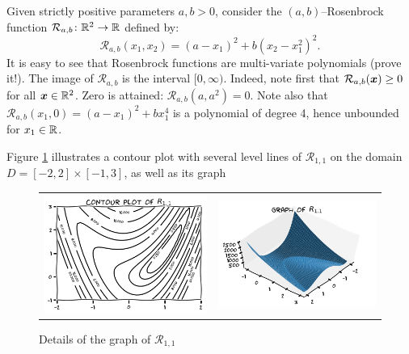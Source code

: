 \begin{example}\label{example:Rosenbrock2}
Given strictly positive parameters $a,b > 0$, consider the $(a,b)$--Rosenbrock function $\mathcal{R}_{a,b}\colon \mathbb{R}^2 \to \mathbb{R}$ defined by:
\begin{equation*} 
\mathcal{R}_{a,b}(x_1, x_2) = (a-x_1)^2 + b(x_2-x_1^2)^2.
\end{equation*}
It is easy to see that Rosenbrock functions are multi-variate polynomials (prove it!).  The image of $\mathcal{R}_{a,b}$ is the interval $[0,\infty)$.  Indeed, note first that $\mathcal{R}_{a,b}(\boldsymbol{x}) \geq 0$ for all $\boldsymbol{x} \in \mathbb{R}^2$.  Zero is attained: $\mathcal{R}_{a,b} (a,a^2) = 0$.  Note also that $\mathcal{R}_{a,b}(x_1,0) = (a-x_1)^2 + bx_1^4$ is a polynomial of degree 4, hence unbounded for $x_1 \in \mathbb{R}$.

Figure \ref{figure:Rosenbrock} illustrates a contour plot with several level lines of $\mathcal{R}_{1,1}$ on the domain $D = [-2,2] \times [-1,3]$, as well as its graph
\begin{figure}[ht!]
\begin{tabular}{cc}
\includegraphics[width=0.5\linewidth]{rosenbrockContour} &
\includegraphics[width=0.5\linewidth]{rosenbrockGraph}
\end{tabular}
\caption{Details of the graph of $\mathcal{R}_{1,1}$}
\label{figure:Rosenbrock}
\end{figure}
\end{example}

